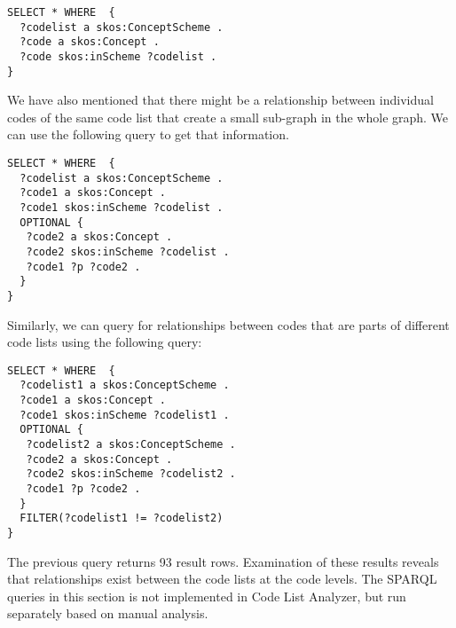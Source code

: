 \begin{lstlisting}[captionpos=b, caption=Query to get all code lists with codes,label=lst:sparql8,basicstyle=\ttfamily,frame=single]
SELECT * WHERE  {
  ?codelist a skos:ConceptScheme .
  ?code a skos:Concept .
  ?code skos:inScheme ?codelist .
}
\end{lstlisting}

We have also mentioned that there might be a relationship between individual codes of the same code list that create a small sub-graph in the whole graph. We can use the following query to get that information.


\begin{lstlisting}[captionpos=b, caption=Query to capture the structures of code lists,label=lst:sparql9,basicstyle=\ttfamily,frame=single]
SELECT * WHERE  {
  ?codelist a skos:ConceptScheme .
  ?code1 a skos:Concept .
  ?code1 skos:inScheme ?codelist .
  OPTIONAL {
   ?code2 a skos:Concept .
   ?code2 skos:inScheme ?codelist .
   ?code1 ?p ?code2 .
  }
}
\end{lstlisting}

Similarly, we can query for relationships between codes that are parts of different code lists using the following query:

\begin{lstlisting}[captionpos=b, caption=Query to capture the relationships between code list members,label=lst:sparql10,basicstyle=\ttfamily,frame=single]
SELECT * WHERE  {
  ?codelist1 a skos:ConceptScheme .
  ?code1 a skos:Concept .
  ?code1 skos:inScheme ?codelist1 .
  OPTIONAL {
   ?codelist2 a skos:ConceptScheme .
   ?code2 a skos:Concept .
   ?code2 skos:inScheme ?codelist2 .
   ?code1 ?p ?code2 .
  }
  FILTER(?codelist1 != ?codelist2)
}
\end{lstlisting}

The previous query returns 93 result rows. Examination of these results reveals that relationships exist between the code lists at the code levels. The SPARQL queries in this section is not implemented in Code List Analyzer, but run separately based on manual analysis. %